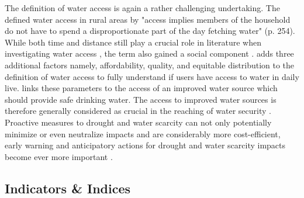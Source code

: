 The definition of water access is again a rather challenging undertaking. The \textcite{worldbankWorldDevelopmentReport1997} defined water access in rural areas by "access implies members of the household do not have to spend a disproportionate part of the day fetching water" (p. 254). While both time and distance still play a crucial role in literature when investigating water access \autocite{cassiviDrinkingWaterAccessibility2019,cassiviEvaluatingSelfreportedMeasures2021,emenikeAccessingSafeDrinking2017}, the term also gained a social component \autocite{emenikeAccessingSafeDrinking2017,mitlinUnaffordableUndrinkable}. \Textcite{obeng-odoomAccessWater2012} adds three additional factors namely, affordability, quality, and equitable distribution to the definition of water access to fully understand if users have access to water in daily live. \Textcite{unitednationsDeepeningDemocracyFragmented2002} links these parameters to the access of an improved water source which should provide safe drinking water. The access to improved water sources is therefore generally considered as crucial in the reaching of water security \autocite{cdcAssessingAccessWater2022}.\newline 
Proactive measures to drought and water scarcity can not only potentially minimize or even neutralize impacts and are considerably more cost-efficient, early warning and anticipatory actions for drought and water scarcity impacts become ever more important \autocite{faoProgressLevelWater2021,idmpDroughtWaterScarcity2022,worldbankHighDryClimate2016}.


\subsection{Indicators \& Indices}\label{subsec:indicators} %

